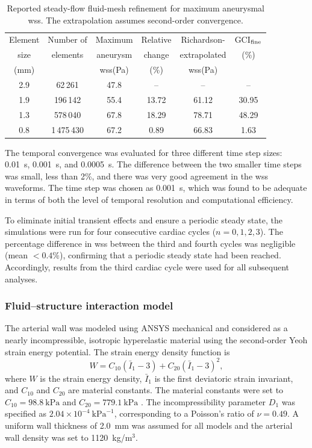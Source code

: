 \documentclass[12pt,a4paper]{article}
\newcommand{\WSS}{\ac{wss}\xspace}
\theoremstyle{definition}
\numberwithin{equation}{section}
\begin{document}
\begin{table}[ht!]
\centering
\setlength{\tabcolsep}{3.5pt}
\caption{Reported steady-flow fluid-mesh refinement for maximum aneurysmal \WSS. The extrapolation assumes second-order convergence.}
\label{tab:mesh_study}
\setlength{\tabcolsep}{7pt}
\begin{tabular}{cccccc}
\toprule
Element & Number of & Maximum & Relative & Richardson- & GCI$_{\rm fine}$ \\
size & elements & aneurysm & change & extrapolated & (\%) \\
(mm) & & \WSS (Pa) & (\%) & \WSS (Pa) & \\
\midrule
2.9 & 62\,261    & 47.8 & --    & --    & -- \\
1.9 & 196\,142   & 55.4 & 13.72 & 61.12 & 30.95 \\
1.3 & 578\,040   & 67.8 & 18.29 & 78.71 & 48.29 \\
0.8 & 1\,475\,430 & 67.2 & 0.89  & 66.83 & 1.63 \\
\bottomrule
\end{tabular}
\end{table}


The temporal convergence was evaluated for three different time step sizes: 0.01~s, 0.001~s, and 0.0005~s. The difference between the two smaller time steps was small, less than 2\%, and there was very good agreement in the \WSS waveforms. The time step was chosen as 0.001~s, which was found to be adequate in terms of both the level of temporal resolution and computational efficiency.

To eliminate initial transient effects and ensure a periodic steady state, the simulations were run for four consecutive cardiac cycles (\(n = 0,1,2,3\)). The percentage difference in \WSS between the third and fourth cycles was negligible (mean \(< 0.4\%\)), confirming that a periodic steady state had been reached. Accordingly, results from the third cardiac cycle were used for all subsequent analyses.



\subsubsection{Fluid--structure interaction model}

The arterial wall was modeled using ANSYS mechanical and considered as a nearly incompressible, isotropic hyperelastic material using the second-order Yeoh strain energy potential. The strain energy density function is
\begin{equation}
W = C_{10}(\bar{I}_1 - 3) + C_{20}(\bar{I}_1 - 3)^2,
\label{eq:yeoh}
\end{equation}
where \(W\) is the strain energy density, \(\bar{I}_1\) is the first deviatoric strain invariant, and \(C_{10}\) and \(C_{20}\) are material constants. The material constants were set to \(C_{10} = 98.8~\text{kPa}\) and \(C_{20} = 779.1~\text{kPa}\) \cite{zhu2025combined}. The incompressibility parameter \(D_1\) was specified as \(2.04 \times 10^{-4}~\text{kPa}^{-1}\), corresponding to a Poisson's ratio of \(\nu = 0.49\). A uniform wall thickness of 2.0~mm was assumed for all models and the arterial wall density was set to 1120~kg/m\(^3\).
\end{document}
